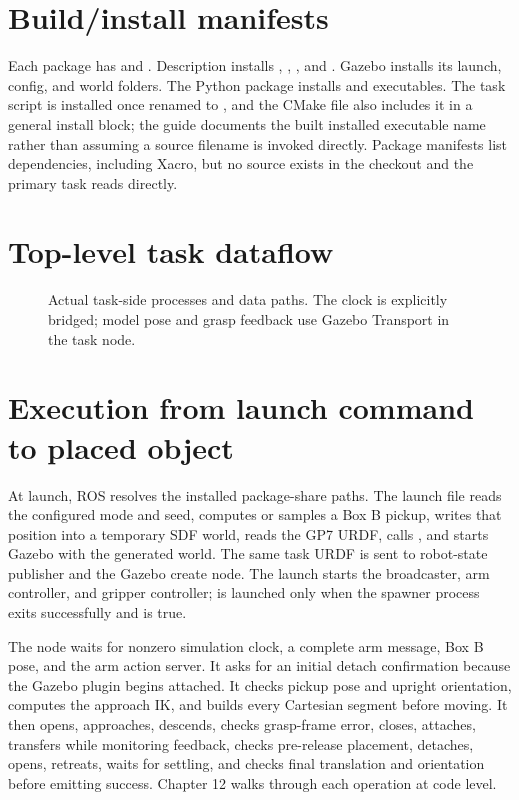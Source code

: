 \section{Build/install manifests}
Each package has  and . Description
installs , , , and . Gazebo
installs its launch, config, and world folders. The Python package installs
 and executables. The task script is installed once renamed
to , and the CMake file also includes it in a general
install block; the guide documents the built installed executable name rather
than assuming a source filename is invoked directly. Package manifests list
dependencies, including Xacro, but no  source exists in the
checkout and the primary task reads  directly.

\section{Top-level task dataflow}
\begin{figure}[htbp]
\centering\resizebox{\textwidth}{!}{}
\caption{Actual task-side processes and data paths. The clock is explicitly
bridged; model pose and grasp feedback use Gazebo Transport in the task node.}
\label{fig:architecture}
\end{figure}

\section{Execution from launch command to placed object}
At launch, ROS resolves the installed package-share paths. The launch file
reads the configured mode and seed, computes or samples a Box B pickup, writes
that position into a temporary SDF world, reads the GP7 URDF, calls
, and starts Gazebo with the generated world. The same
task URDF is sent to robot-state publisher and the Gazebo create node. The
launch starts the broadcaster, arm controller, and gripper controller;
 is launched only when the spawner process exits
successfully and  is true.

The node waits for nonzero simulation clock, a complete arm 
message, Box B pose, and the arm action server. It asks for an initial detach
confirmation because the Gazebo plugin begins attached. It checks pickup pose
and upright orientation, computes the approach IK, and builds every Cartesian
segment before moving. It then opens, approaches, descends, checks grasp-frame
error, closes, attaches, transfers while monitoring feedback, checks
pre-release placement, detaches, opens, retreats, waits for settling, and
checks final translation and orientation before emitting success. Chapter 12
walks through each operation at code level.

